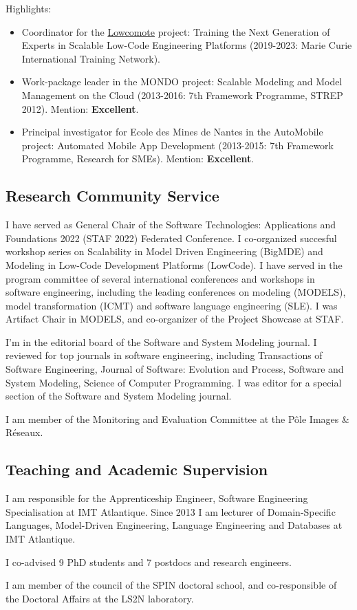 \medskip
Highlights:
 \begin{itemize}
 \item Coordinator for the \href{https://www.lowcomote.eu/}{Lowcomote} project: Training the Next Generation of Experts in Scalable Low-Code Engineering Platforms (2019-2023: Marie Curie International Training Network).
 \item Work-package leader in the MONDO project: Scalable Modeling and Model Management on the Cloud (2013-2016: 7th Framework Programme, STREP 2012). Mention: \textbf{Excellent}.
 \item Principal investigator for Ecole des Mines de Nantes in the AutoMobile project: Automated Mobile App Development (2013-2015: 7th Framework Programme, Research for SMEs). Mention: \textbf{Excellent}.
\end{itemize}

\subsection*{Research Community Service}

I have served as General Chair of the Software Technologies: Applications and Foundations 2022 (STAF 2022) Federated Conference. I co-organized succesful workshop series on Scalability in Model Driven Engineering (BigMDE) and Modeling in Low-Code Development Platforms (LowCode). 
I have served in the program committee of several international conferences and workshops in software engineering, including the leading conferences on modeling (MODELS), model transformation (ICMT) and software language engineering (SLE). I was Artifact Chair in MODELS, and co-organizer of the Project Showcase at STAF.

I'm in the editorial board of the Software and System Modeling journal. I reviewed for top journals in software engineering, including Transactions of Software Engineering, Journal of Software: Evolution and Process, Software and System Modeling, Science of Computer Programming. I was editor for a special section of the Software and System Modeling journal.


I am member of the Monitoring and Evaluation Committee at the Pôle Images \& Réseaux.

\subsection*{Teaching and Academic Supervision}

I am responsible for the Apprenticeship Engineer, Software Engineering Specialisation at IMT Atlantique. Since 2013 I am lecturer of Domain-Specific Languages, Model-Driven Engineering, Language Engineering and Databases at IMT Atlantique. 

I co-advised 9 PhD students and 7 postdocs and research engineers.

I am member of the council of the SPIN doctoral school, and co-responsible of the Doctoral Affairs at the LS2N laboratory.
